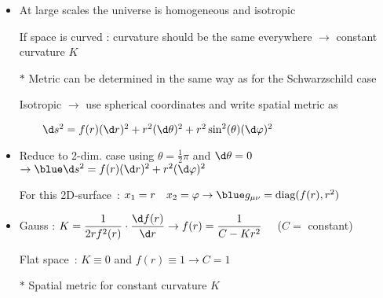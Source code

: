 \onecolumn
\begin{itemize}
\item At large scales the universe is homogeneous and isotropic
\item[] If space is curved : curvature should be the same everywhere
        $\rightarrow$ {\blue constant curvature $K$}
\item[$\ast$] Metric can be determined in the same way as for the Schwarzschild case
\item[] Isotropic $\rightarrow$ use spherical coordinates and write {\red spatial metric} as
\item[] {\blue $\qquad \d s^{2}=f(r)(\d r)^{2}+r^{2}(\d\theta)^{2}+r^{2}\sin^{2}(\theta)(\d\varphi)^{2}$}
\item Reduce to 2-dim. case using $\theta=\frac{1}{2}\pi$ and $\d \theta=0$
      $\rightarrow {\blue \d s^{2}=f(r)(\d r)^{2}+r^{2}(\d\varphi)^{2}}$
\item[] For this 2D-surface~: $x_{1}=r \quad x_{2}=\varphi
        \rightarrow {\blue g_{\mu\nu}=\text{diag}(f(r),r^{2})}$
\item Gauss : $\displaystyle K=\frac{1}{2rf^{2}(r)} \cdot \frac{\d f(r)}{\d r}
               \rightarrow f(r)=\frac{1}{C-Kr^{2}} \quad$ ($C=$ constant)
\item[] Flat space~: $K \equiv 0$ and $f(r) \equiv 1 \rightarrow C=1$
\item[$\ast$] {\blue Spatial metric for constant curvature $K$}
\item[] \begin{center}
         {\red {}}
        \end{center}
\end{itemize}

